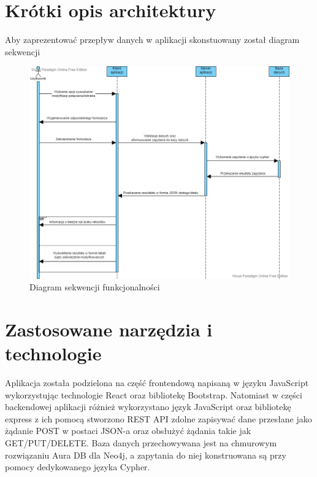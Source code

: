 \documentclass[12pt]{article}
\begin{document}
\section{Krótki opis architektury}
Aby zaprezentować przepływ danych w aplikacji skonstuowany został diagram sekwencji
\begin{figure}[!ht]
    \centering
    \includegraphics[width=0.95\linewidth]{10}  
    \caption{Diagram sekwencji funkcjonalności}
\end{figure}
\section{Zastosowane narzędzia i technologie}
Aplikacja została podzielona na część frontendową napisaną w języku JavaScript wykorzystując technologie React oraz bibliotekę Bootstrap. Natomiast w części backendowej aplikacji różnież wykorzystano język JavaScript oraz bibliotekę express z ich pomocą stworzono
REST API zdolne zapisywać dane przesłane jako żądanie POST w postaci JSON-a oraz obsłużyć żądania takie jak GET/PUT/DELETE.
Baza danych przechowywana jest na chmurowym rozwiązaniu Aura DB dla Neo4j, a zapytania do niej konstruowana są przy pomocy dedykowanego języka Cypher.
\newpage
\end{document}
